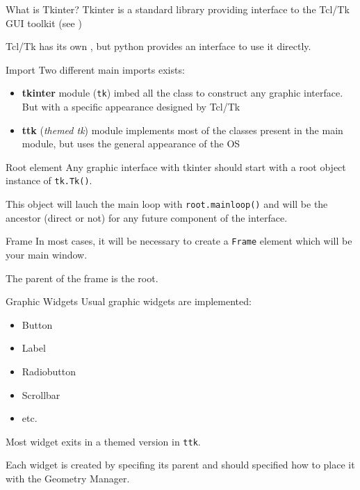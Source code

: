 \begin{frame}{What is Tkinter?}
    \alert{Tkinter} is a standard library providing interface to the \alert{Tcl/Tk} GUI toolkit (see )

    \vfill

    Tcl/Tk has its own ,
    but python provides an interface to use it directly.
\end{frame}

\begin{frame}{Import}
    Two different main imports exists:

    \begin{itemize}
        \item \textbf{tkinter} module (\texttt{tk}) imbed all the class to construct any graphic interface. But with a specific appearance designed by Tcl/Tk
        \item \textbf{ttk} (\textit{themed tk}) module implements most of the classes present in the main module, but uses the general appearance of the OS
    \end{itemize}

\end{frame}

\begin{frame}{Root element}
    Any graphic interface with tkinter should start with a root object instance of \texttt{tk.Tk()}.


    This object will lauch the main loop with \texttt{root.mainloop()} and will be
    the ancestor (direct or not) for any future component of the interface.

\end{frame}

\begin{frame}{Frame}
    In most cases, it will be necessary to create a \texttt{Frame} element which will be your main window.


    The parent of the frame is the root.
\end{frame}

\begin{frame}{Graphic Widgets}
    Usual graphic widgets are implemented:
    \begin{itemize}
        \item Button
        \item Label
        \item Radiobutton
        \item Scrollbar
        \item etc.
    \end{itemize}
    Most widget exits in a themed version in \texttt{ttk}.
    \vfill

    Each widget is created by specifing its parent and should specified how to place it with the \alert{Geometry Manager}.

\end{frame}

